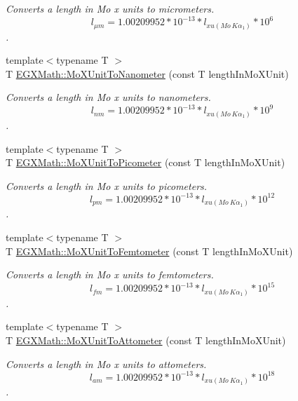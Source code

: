 \begin{DoxyCompactItemize}
\begin{DoxyCompactList}\small\item\em Converts a length in Mo x units to micrometers. \[ l_{\mu m}=1.00209952*10^{-13} * l_{xu(Mo\ K\alpha_1)} * 10^{6} \]. \end{DoxyCompactList}\item 
{\footnotesize template$<$typename T $>$ }\\T \mbox{\hyperlink{group___e_g_x_math-_conversions-_length_conversions-_non-_s_i-_mo_x_unit-_s_i_ga69668ee6be867c3f92e31f29ec2ae7fa}{E\+G\+X\+Math\+::\+Mo\+X\+Unit\+To\+Nanometer}} (const T length\+In\+Mo\+X\+Unit)
\begin{DoxyCompactList}\small\item\em Converts a length in Mo x units to nanometers. \[ l_{nm}=1.00209952*10^{-13} * l_{xu(Mo\ K\alpha_1)} * 10^{9} \]. \end{DoxyCompactList}\item 
{\footnotesize template$<$typename T $>$ }\\T \mbox{\hyperlink{group___e_g_x_math-_conversions-_length_conversions-_non-_s_i-_mo_x_unit-_s_i_ga9b06995f2d8ddd611999e65539f0896c}{E\+G\+X\+Math\+::\+Mo\+X\+Unit\+To\+Picometer}} (const T length\+In\+Mo\+X\+Unit)
\begin{DoxyCompactList}\small\item\em Converts a length in Mo x units to picometers. \[ l_{pm}=1.00209952*10^{-13} * l_{xu(Mo\ K\alpha_1)} * 10^{12} \]. \end{DoxyCompactList}\item 
{\footnotesize template$<$typename T $>$ }\\T \mbox{\hyperlink{group___e_g_x_math-_conversions-_length_conversions-_non-_s_i-_mo_x_unit-_s_i_ga4ee8e623c653ebdcae1d02ae42714afc}{E\+G\+X\+Math\+::\+Mo\+X\+Unit\+To\+Femtometer}} (const T length\+In\+Mo\+X\+Unit)
\begin{DoxyCompactList}\small\item\em Converts a length in Mo x units to femtometers. \[ l_{fm}=1.00209952*10^{-13} * l_{xu(Mo\ K\alpha_1)} * 10^{15} \]. \end{DoxyCompactList}\item 
{\footnotesize template$<$typename T $>$ }\\T \mbox{\hyperlink{group___e_g_x_math-_conversions-_length_conversions-_non-_s_i-_mo_x_unit-_s_i_gae503164583f30916aea60eda17993712}{E\+G\+X\+Math\+::\+Mo\+X\+Unit\+To\+Attometer}} (const T length\+In\+Mo\+X\+Unit)
\begin{DoxyCompactList}\small\item\em Converts a length in Mo x units to attometers. \[ l_{am}=1.00209952*10^{-13} * l_{xu(Mo\ K\alpha_1)} * 10^{18} \]. \end{DoxyCompactList}\item 

\end{DoxyCompactItemize}
